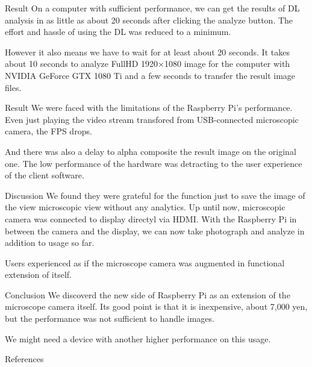 \documentclass[
  dvipdfmx,
  xcolor={svgnames},
  hyperref={colorlinks,citecolor=DeepPink4,linkcolor=DarkRed,urlcolor=DarkBlue}
  ]{beamer}
\begin{document}
\begin{frame}{Result}
  On a computer with sufficient performance, we can get the results of DL analysis in as little as about 20 seconds after clicking the analyze button. The effort and hassle of using the DL was reduced to a minimum. \par
  \vspace{0.5zh}
  However it also means we have to wait for at least about 20 seconds. It takes about 10 seconds to analyze FullHD 1920×1080 image for the computer with NVIDIA GeForce GTX 1080 Ti and a few seconds to transfer the result image files.
\end{frame}

\begin{frame}{Result}
  We were faced with the limitations of the Raspberry Pi's performance. Even just playing the video stream transfored from USB-connected microscopic camera, the FPS drops. \par
  \vspace{0.5zh}
  And there was also a delay to alpha composite the result image on the original one. The low performance of the hardware was detracting to the user experience of the client software.
\end{frame}

\begin{frame}{Discussion}
  We found they were grateful for the function just to save the image of the view microscopic view without any analytics. Up until now, microscopic camera was connected to display directyl via HDMI.  With the Raspberry Pi in between the camera and the display, we can now take photograph and analyze in addition to usage so far. \par
  \vspace{0.5zh}
  Users experienced as if the microscope camera was augmented in functional extension of itself.
\end{frame}

\begin{frame}{Conclusion}
  We discoverd the new side of Raspberry Pi as an extension of the microscope camera itself. Its good point is that it is inexpensive, about 7,000 yen, but the performance was not sufficient to handle images. \par
  \vspace{0.5zh}
  We might need a device with another higher performance on this usage.
\end{frame}

\begin{frame}{References}
  \begin{figure}
    \beamertemplatetextbibitems
    
    
  \end{figure}
\end{frame}
\end{document}
